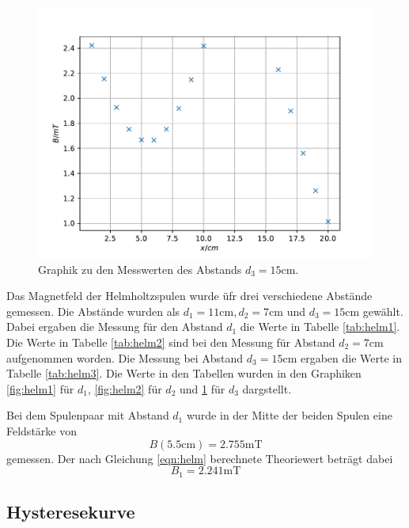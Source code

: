 \begin{figure}
\centering
\includegraphics{content/data/plot_helmholtz3.pdf}
\caption{Graphik zu den Messwerten des Abstands $d_3=15\si{\centi\metre}$.}
\label{fig:helm3}
\end{figure}


Das Magnetfeld der Helmholtzspulen wurde üfr drei verschiedene Abstände gemessen.
Die Abstände wurden als $d_1=11\si{\centi\metre}, d_2=7\si{\centi\metre}$ und $d_3= 15 \si{\centi\metre}$ gewählt.
Dabei ergaben die Messung für den Abstand $d_1$ die Werte in Tabelle \ref{tab:helm1}.
Die Werte in Tabelle \ref{tab:helm2} sind bei den Messung für Abstand $d_2=7\si{\centi\metre}$ aufgenommen worden.
Die Messung bei Abstand $d_3=15\si{\centi\metre}$ ergaben die Werte in Tabelle \ref{tab:helm3}.
Die Werte in den Tabellen wurden in den Graphiken \ref{fig:helm1} für $d_1$, \ref{fig:helm2} für $d_2$ und \ref{fig:helm3} für $d_3$ dargstellt.

Bei dem Spulenpaar mit Abstand $d_1$ wurde in der Mitte der beiden Spulen eine Feldstärke von 
\begin{equation*}
  B(5.5\si{\centi\meter}) = 2.755 \si{\milli\tesla}
\end{equation*}
gemessen.
Der nach Gleichung \eqref{eqn:helm} berechnete Theoriewert beträgt dabei
\begin{equation*}
  B_1= 2.241 \si{\milli\tesla}
\end{equation*}

\FloatBarrier
\subsection{Hysteresekurve}

